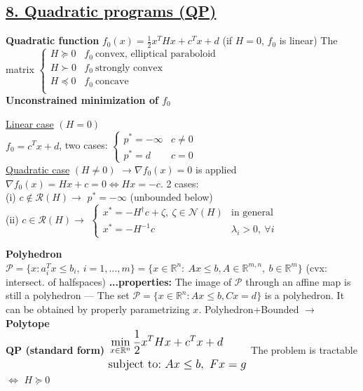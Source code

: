 \documentclass[a4paper]{article}
\begin{document}
\subsection*{\underline{8. Quadratic programs (QP)}} 
\textbf{Quadratic function} $f_0(x)=\frac{1}{2}x^T{H}x+c^T{x}+d$ (if $H=0$, $f_0$ is linear) The matrix $\begin{cases}
    H\succeq0&f_0 \ \text{convex, elliptical paraboloid}\\
    H\succ0&f_0 \ \text{strongly convex}\\
    H\preceq0&f_0 \ \text{concave}\\
\end{cases}$\\
\textbf{Unconstrained minimization of $f_0$}
\vspace{-0.3cm}
\begin{multicols}{2}
    \noindent
    \textsf{\underline{Linear case} $(H=0)$}\\
    $f_0=c^T{x}+d$, two cases: $\begin{cases}
        p^*=-\infty&{c\ne0}\\
        p^*=d&c=0
    \end{cases}$
    \newcolumn\\
    \textsf{\underline{Quadratic case} $(H\ne0)$} $\to \nabla{f_0(x)}=0$ is applied\\
    $\nabla{f_0(x)}=Hx+c=0 \iff Hx = -c$. 2 cases:\\
    (i) $c\notin\mathcal{R}(H)\to$ $p^*=-\infty$ (unbounded below)\\
    (ii) $c\in\mathcal{R}(H)\to$ $\begin{cases}
        x^*=-H^{\dagger}c+\zeta, \ \zeta \in \mathcal{N}(H)&\text{in general}\\
        x^*=-H^{-1}c&\lambda_i>0, \ \forall i
    \end{cases}$
\end{multicols}
\noindent
\textbf{Polyhedron} $\mathcal{P}=\{x: a_i^T{x}\le{b}_i, \ i=1,...,m\}=\{x\in\mathbb{R}^n: \ Ax\le{b}, A\in\mathbb{R}^{m,n}, \ b\in\mathbb{R}^m\}$ (cvx: intersect. of halfspaces)
\textbf{...properties:} The image of $\mathcal{P}$ through an affine map is still a polyhedron --- The set $\mathcal{P}=\{x\in\mathbb{R}^n:Ax\le{b}, Cx=d\}$ is a polyhedron. It can be obtained by properly parametrizing $x$. Polyhedron+Bounded $\to$ \textbf{Polytope}\\
\textbf{QP (standard form)} $\large \begin{aligned}
    &\min_{x\in\mathbb{R}^n}{\frac{1}{2}x^T{H}x+c^T{x}+d}\\
    &\text{subject to:} \ Ax\le{b}, \ Fx=g
\end{aligned}$ The problem is tractable $\iff$ $H\succeq0$
\end{document}

